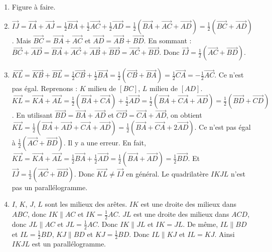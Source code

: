 \begin{enumerate}[label=\arabic*)]
\item Figure à faire.
\item $\overrightarrow{IJ} = \overrightarrow{IA} + \overrightarrow{AJ} = \frac{1}{2}\overrightarrow{BA} + \frac{1}{2}\overrightarrow{AC} + \frac{1}{2}\overrightarrow{AD} = \frac{1}{2}(\overrightarrow{BA}+\overrightarrow{AC}+\overrightarrow{AD}) = \frac{1}{2}(\overrightarrow{BC}+\overrightarrow{AD})$. Mais $\overrightarrow{BC} = \overrightarrow{BA}+\overrightarrow{AC}$ et $\overrightarrow{AD} = \overrightarrow{AB}+\overrightarrow{BD}$. En sommant : $\overrightarrow{BC}+\overrightarrow{AD} = \overrightarrow{BA}+\overrightarrow{AC}+\overrightarrow{AB}+\overrightarrow{BD} = \overrightarrow{AC}+\overrightarrow{BD}$. Donc $\overrightarrow{IJ} = \frac{1}{2}(\overrightarrow{AC}+\overrightarrow{BD})$.
\item $\overrightarrow{KL} = \overrightarrow{KB}+\overrightarrow{BL} = \frac{1}{2}\overrightarrow{CB} + \frac{1}{2}\overrightarrow{BA} = \frac{1}{2}(\overrightarrow{CB}+\overrightarrow{BA}) = \frac{1}{2}\overrightarrow{CA} = -\frac{1}{2}\overrightarrow{AC}$. Ce n'est pas égal. Reprenons : $K$ milieu de $[BC]$, $L$ milieu de $[AD]$. $\overrightarrow{KL} = \overrightarrow{KA}+\overrightarrow{AL} = \frac{1}{2}(\overrightarrow{BA}+\overrightarrow{CA}) + \frac{1}{2}\overrightarrow{AD} = \frac{1}{2}(\overrightarrow{BA}+\overrightarrow{CA}+\overrightarrow{AD}) = \frac{1}{2}(\overrightarrow{BD}+\overrightarrow{CD})$. En utilisant $\overrightarrow{BD} = \overrightarrow{BA}+\overrightarrow{AD}$ et $\overrightarrow{CD} = \overrightarrow{CA}+\overrightarrow{AD}$, on obtient $\overrightarrow{KL} = \frac{1}{2}(\overrightarrow{BA}+\overrightarrow{AD}+\overrightarrow{CA}+\overrightarrow{AD}) = \frac{1}{2}(\overrightarrow{BA}+\overrightarrow{CA}+2\overrightarrow{AD})$. Ce n'est pas égal à $\frac{1}{2}(\overrightarrow{AC}+\overrightarrow{BD})$. Il y a une erreur. En fait, $\overrightarrow{KL} = \overrightarrow{KA}+\overrightarrow{AL} = \frac{1}{2}\overrightarrow{BA} + \frac{1}{2}\overrightarrow{AD} = \frac{1}{2}(\overrightarrow{BA}+\overrightarrow{AD}) = \frac{1}{2}\overrightarrow{BD}$. Et $\overrightarrow{IJ} = \frac{1}{2}(\overrightarrow{AC}+\overrightarrow{BD})$. Donc $\overrightarrow{KL} \neq \overrightarrow{IJ}$ en général. Le quadrilatère $IKJL$ n'est pas un parallélogramme.
\item $I$, $K$, $J$, $L$ sont les milieux des arêtes. $IK$ est une droite des milieux dans $ABC$, donc $IK\parallel AC$ et $IK=\frac{1}{2}AC$. $JL$ est une droite des milieux dans $ACD$, donc $JL\parallel AC$ et $JL=\frac{1}{2}AC$. Donc $IK\parallel JL$ et $IK=JL$. De même, $IL\parallel BD$ et $IL=\frac{1}{2}BD$, $KJ\parallel BD$ et $KJ=\frac{1}{2}BD$. Donc $IL\parallel KJ$ et $IL=KJ$. Ainsi $IKJL$ est un parallélogramme.

\end{enumerate}
